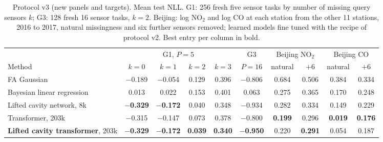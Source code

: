 \begin{table}[t]
\centering\small
\setlength{\tabcolsep}{3pt}
\caption{\label{tab:v3}Protocol v3 (new panels and targets). Mean test NLL. G1: 256 fresh five sensor tasks by number of missing query sensors $k$; G3: 128 fresh 16 sensor tasks, $k=2$. Beijing: log NO$_2$ and log CO at each station from the other 11 stations, 2016 to 2017, natural missingness and six further sensors removed; learned models fine tuned with the recipe of protocol v2. Best entry per column in bold.}
\begin{tabular}{lccccccccc}
\toprule
 & \multicolumn{4}{c}{G1, $P{=}5$} & G3 & \multicolumn{2}{c}{Beijing NO$_2$} & \multicolumn{2}{c}{Beijing CO}\\
Method & $k{=}0$ & $k{=}1$ & $k{=}2$ & $k{=}3$ & $P{=}16$ & natural & $+6$ & natural & $+6$\\
\midrule
FA Gaussian & $-$0.189 & $-$0.054 & 0.129 & 0.396 & $-$0.806 & 0.684 & 0.506 & 0.384 & 0.334\\
Bayesian linear regression & 0.013 & 0.022 & 0.153 & 0.401 & 0.063 & 0.275 & 0.365 & 0.170 & 0.248\\
\midrule
Lifted cavity network, 8k & \textbf{$-$0.329} & \textbf{$-$0.172} & 0.040 & 0.348 & $-$0.934 & 0.282 & 0.334 & 0.149 & 0.229\\
Transformer, 203k & $-$0.315 & $-$0.147 & 0.073 & 0.378 & $-$0.800 & \textbf{0.199} & 0.296 & \textbf{0.019} & \textbf{0.176}\\
\textbf{Lifted cavity transformer}, 203k & \textbf{$-$0.329} & \textbf{$-$0.172} & \textbf{0.039} & \textbf{0.340} & \textbf{$-$0.950} & 0.220 & \textbf{0.291} & 0.054 & 0.187\\
\bottomrule
\end{tabular}
\end{table}
